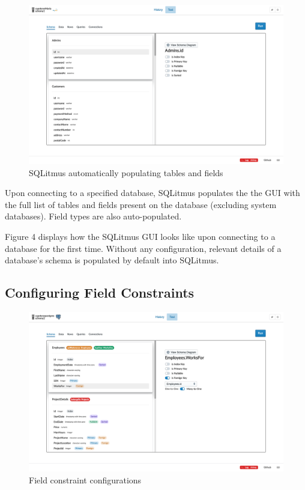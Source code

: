 \documentclass[12pt]{report}
\begin{document}
\begin{spacing}{1.9}
		
		\begin{figure}[H]
			\centering
			\includegraphics[width=\textwidth]{3-2.png}
			\caption{SQLitmus automatically populating tables and fields}
			
		\end{figure}
		
		Upon connecting to a specified database, SQLitmus populates the the GUI with the full list of tables and fields present on the database (excluding system databases). Field types are also auto-populated.
		
		Figure 4 displays how the SQLitmus GUI looks like upon connecting to a database for the first time. Without any configuration, relevant details of a database's schema is populated by default into SQLitmus.
		
		\subsection{Configuring Field Constraints}
		
		
		\begin{figure}[H]
			\centering
			\includegraphics[width=\textwidth]{3-2-1.png}
			\caption{Field constraint configurations}
			

\end{figure}
\end{spacing}
\end{document}

